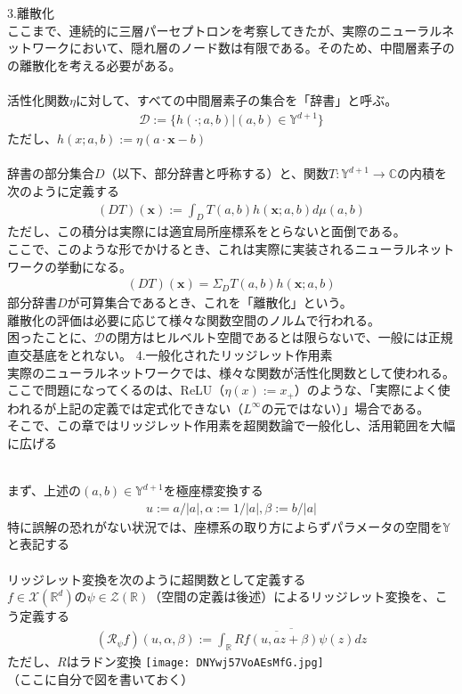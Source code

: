 \documentclass{jsarticle}
\begin{document}
　\\
　\\
3.離散化\\
ここまで、連続的に三層パーセプトロンを考察してきたが、実際のニューラルネットワークにおいて、隠れ層のノード数は有限である。そのため、中間層素子のの離散化を考える必要がある。\\
　\\
活性化関数$\eta$に対して、すべての中間層素子の集合を「辞書」と呼ぶ。
\begin{eqnarray}
\mathcal{D}:=\{h(\cdot;a,b)|(a,b)\in\mathbb{Y}^{d+1}\}
\end{eqnarray}
ただし、$h(x;a,b):=\eta(a\cdot\bm{x}-b)$\\
　\\
辞書の部分集合$D$（以下、部分辞書と呼称する）と、関数$T:\mathbb{Y}^{d+1}\rightarrow\mathbb{C}$の内積を次のように定義する
\begin{eqnarray}
(DT)(\bm{x}):=\int_D T(a,b)h(\bm{x};a,b)d\mu(a,b)
\end{eqnarray}
ただし、この積分は実際には適宜局所座標系をとらないと面倒である。\\
ここで、このような形でかけるとき、これは実際に実装されるニューラルネットワークの挙動になる。
\begin{eqnarray}
(DT)(\bm{x})=\Sigma_D T(a,b)h(\bm{x};a,b)
\end{eqnarray}
部分辞書$D$が可算集合であるとき、これを「離散化」という。\\
離散化の評価は必要に応じて様々な関数空間のノルムで行われる。\\
困ったことに、$\mathcal{D}$の閉方はヒルベルト空間であるとは限らないで、一般には正規直交基底をとれない。
\newpage
4.一般化されたリッジレット作用素\\
実際のニューラルネットワークでは、様々な関数が活性化関数として使われる。\\
ここで問題になってくるのは、ReLU（$\eta(x):=x_+$）のような、「実際によく使われるが上記の定義では定式化できない（$L^\infty$の元ではない）」場合である。\\
そこで、この章ではリッジレット作用素を超関数論で一般化し、活用範囲を大幅に広げる

　\\
まず、上述の$(a,b)\in\mathbb{Y}^{d+1}$を極座標変換する
\begin{eqnarray}
u:=a/|a|,\alpha:=1/|a|,\beta:=b/|a|
\end{eqnarray}
特に誤解の恐れがない状況では、座標系の取り方によらずパラメータの空間を$\mathbb{Y}$と表記する\\
　\\
リッジレット変換を次のように超関数として定義する\\
$f\in\mathcal{X}(\mathbb{R}^d)$の$\psi\in\mathcal{Z}(\mathbb{R})$（空間の定義は後述）によるリッジレット変換を、こう定義する
\begin{eqnarray}
(\mathcal{R}_\psi f)(u,\alpha,\beta):=\overline{\int_{\mathbb{R}}\overline{Rf(u,az+\beta)}\psi(z)dz}
\end{eqnarray}
ただし、$R$はラドン変換
\texttt{[image: DNYwj57VoAEsMfG.jpg]}\\
（ここに自分で図を書いておく）\\
\end{document}

